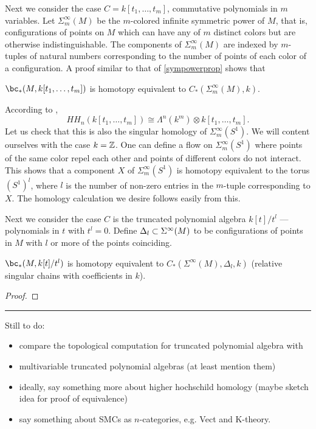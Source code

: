 \medskip

Next we consider the case $C = k[t_1, \ldots, t_m]$, commutative polynomials in $m$ variables.
Let $\Sigma_m^\infty(M)$ be the $m$-colored infinite symmetric power of $M$, that is, configurations
of points on $M$ which can have any of $m$ distinct colors but are otherwise indistinguishable.
The components of $\Sigma_m^\infty(M)$ are indexed by $m$-tuples of natural numbers
corresponding to the number of points of each color of a configuration.
A proof similar to that of \ref{sympowerprop} shows that

\begin{prop}
$\bc_*(M, k[t_1, \ldots, t_m])$ is homotopy equivalent to $C_*(\Sigma_m^\infty(M), k)$.
\end{prop}

According to \cite[3.2.2]{MR1600246},
\[
	HH_n(k[t_1, \ldots, t_m]) \cong \Lambda^n(k^m) \otimes k[t_1, \ldots, t_m] .
\]
Let us check that this is also the singular homology of $\Sigma_m^\infty(S^1)$.
We will content ourselves with the case $k = \mathbb{Z}$.
One can define a flow on $\Sigma_m^\infty(S^1)$ where points of the 
same color repel each other and points of different colors do not interact.
This shows that a component $X$ of $\Sigma_m^\infty(S^1)$ is homotopy equivalent
to the torus $(S^1)^l$, where $l$ is the number of non-zero entries in the $m$-tuple
corresponding to $X$.
The homology calculation we desire follows easily from this.


\medskip

Next we consider the case $C$ is the truncated polynomial
algebra $k[t]/t^l$ --- polynomials in $t$ with $t^l = 0$.
Define $\Delta_l \subset \Sigma^\infty(M)$ to be configurations of points in $M$ with $l$ or
more of the points coinciding.

\begin{prop}
$\bc_*(M, k[t]/t^l)$ is homotopy equivalent to $C_*(\Sigma^\infty(M), \Delta_l, k)$
(relative singular chains with coefficients in $k$).
\end{prop}

\begin{proof}
\end{proof}

\medskip
\hrule
\medskip

Still to do:
\begin{itemize}
\item compare the topological computation for truncated polynomial algebra with \cite{MR1600246}
\item multivariable truncated polynomial algebras (at least mention them)
\item ideally, say something more about higher hochschild homology (maybe sketch idea for proof of equivalence)
\item say something about SMCs as $n$-categories, e.g. Vect and K-theory.
\end{itemize}

